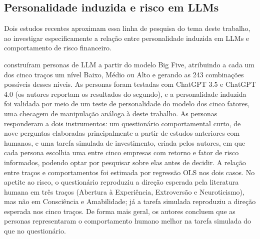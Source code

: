 \subsection{Personalidade induzida e risco em LLMs}
\label{sec:ref-llm-risco}

Dois estudos recentes aproximam essa linha de pesquisa do tema deste
trabalho, ao investigar especificamente a relação entre personalidade
induzida em LLMs e comportamento de risco financeiro.

 construíram personas de LLM a partir do modelo
Big Five, atribuindo a cada um dos cinco traços um nível Baixo, Médio ou
Alto e gerando as 243 combinações possíveis desses níveis. As personas
foram testadas com ChatGPT 3.5 e ChatGPT 4.0 (os autores reportam os
resultados do segundo), e a personalidade induzida foi validada por meio
de um teste de personalidade do modelo dos cinco fatores, uma checagem
de manipulação análoga à deste trabalho. As personas responderam a dois
instrumentos: um questionário comportamental curto, de nove perguntas
elaboradas principalmente a partir de estudos anteriores com humanos, e
uma tarefa simulada de investimento, criada pelos autores, em que cada
persona escolhia uma entre cinco empresas com retorno e fator de risco
informados, podendo optar por pesquisar sobre elas antes de decidir. A
relação entre traços e comportamentos foi estimada por regressão OLS nos
dois casos. No apetite ao risco, o questionário reproduziu a direção
esperada pela literatura humana em três traços (Abertura à Experiência,
Extroversão e Neuroticismo), mas não em Consciência e Amabilidade; já a
tarefa simulada reproduziu a direção esperada nos cinco traços. De forma
mais geral, os autores concluem que as personas representaram o
comportamento humano melhor na tarefa simulada do que no questionário.

